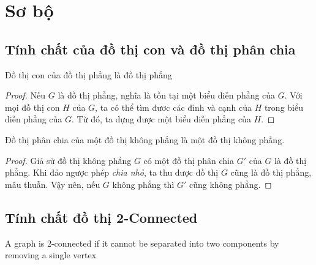 \section{Sơ bộ}
\subsection{Tính chất của đồ thị con và đồ thị phân chia}

\begin{corollary}
    Đồ thị con của đồ thị phẳng là đồ thị phẳng
\end{corollary}

\begin{proof}
    Nếu $G$ là đồ thị phẳng, nghĩa là tồn tại một biểu diễn phẳng của $G$. Với mọi đồ thị con
    $H$ của $G$, ta có thể tìm đươc các đỉnh và cạnh của $H$ trong biểu diễn phẳng của $G$.
    Từ đó, ta dựng được một biểu diễn phẳng của $H$.
\end{proof}


\begin{corollary}
    Đồ thị phân chia của một đồ thị không phẳng là một đồ thị không phẳng.
\end{corollary}
\begin{proof}
    Giả sử đồ thị không phẳng $G$ có một đồ thị phân chia $G'$ của $G$ là đồ thị phẳng.
    Khi đảo ngược phép \textit{chia nhỏ}, ta thu được đồ thị $G$ cũng là đồ thị phẳng, mâu thuẫn.
    Vậy nên, nếu $G$ không phẳng thì $G'$ cũng không phẳng.
\end{proof}

\subsection{Tính chất đồ thị 2-Connected}
\begin{definition}
    A graph is 2-connected if it cannot be separated into two components by removing a single vertex
\end{definition}

